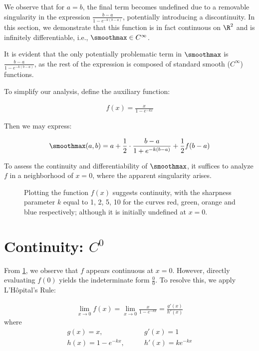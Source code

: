 We observe that for $a = b$, the final term becomes undefined due to a removable singularity in the expression $\frac{b - a}{1 - e^{-k(b - a)}}$, potentially introducing a discontinuity. In this section, we demonstrate that this function is in fact continuous on $\R^2$ and is infinitely differentiable, i.e., $\smoothmax \in C^\infty$.

It is evident that the only potentially problematic term in $\smoothmax$ is $\frac{b - a}{1 - e^{-k(b - a)}}$, as the rest of the expression is composed of standard smooth ($C^\infty$) functions.

To simplify our analysis, define the auxiliary function:

\begin{align}
    f(x) = \frac{x}{1 - e^{-kx}}
\end{align}

Then we may express:

\begin{align}
    \smoothmax(a, b) = a + \frac{1}{2} \cdot \frac{b - a}{1 + e^{-k(b - a)}} + \frac{1}{2} f(b - a)
\end{align}

To assess the continuity and differentiability of $\smoothmax$, it suffices to analyze $f$ in a neighborhood of $x = 0$, where the apparent singularity arises.

\begin{figure}
    \caption{Plotting the function $f(x)$ suggests continuity, with the sharpness parameter $k$ equal to 1, 2, 5, 10 for the curves red, green, orange and blue respectively; although it is initially undefined at $x = 0$.}
    \label{fig:smoothmax-f-plot}
\end{figure}

\section{Continuity: $C^0$}

From \cref{fig:smoothmax-f-plot}, we observe that $f$ appears continuous at $x = 0$. However, directly evaluating $f(0)$ yields the indeterminate form $\frac{0}{0}$. To resolve this, we apply L'Hôpital's Rule:

\begin{align}
    \lim_{x \to 0} f(x) = \lim_{x \to 0} \frac{x}{1 - e^{-kx}} = \frac{g'(x)}{h'(x)}
\end{align}
where
\begin{align}
    g(x) = x, \quad & \quad g'(x) = 1 \\
    h(x) = 1 - e^{-kx}, \quad & \quad h'(x) = k e^{-kx}
\end{align}

